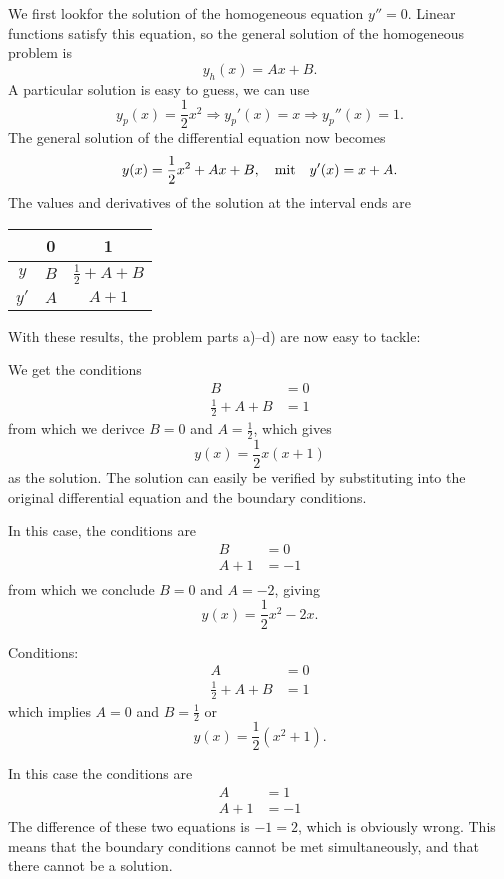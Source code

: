 \begin{loesung}
We first lookfor the solution of the homogeneous equation
$y''=0$.
Linear functions satisfy this equation, so the general solution of
the homogeneous problem is
\[
y_h(x)=Ax+B.
\]
A particular solution is easy to guess, we can use
\[
y_p(x)=\frac12x^2\Rightarrow y_p'(x)=x\Rightarrow y_p''(x)=1.
\]
The general solution of the differential equation now becomes
\[
y(x)=\frac12x^2+Ax+B, \text{\quad mit\quad} y'(x)=x+A.
\]
The values and derivatives of the solution at the interval ends are
\begin{center} 
\begin{tabular}{|c|cc|}
\hline
&0&1\\
\hline
$y$&$B$&$\frac12 +A+B$\\
$y'$&$A$&$A+1$\\
\hline
\end{tabular}
\end{center}
With these results, the problem parts a)--d) are now easy to tackle:
\begin{teilaufgaben}
\item
We get the conditions
\begin{align*}
B&=0\\
\frac12+A+B&=1
\end{align*}
from which we derivce $B=0$ and $A=\frac12$, which gives
\[
y(x)=\frac12x(x+1)
\]
as the solution.
The solution can easily be verified by substituting into the
original differential equation and the boundary conditions.
\item
In this case, the conditions are
\begin{align*}
B&=0\\
A+1&=-1\\
\end{align*}
from which we conclude $B=0$ and $A=-2$, giving
\[
y(x)=\frac12x^2-2x.
\]
\item
Conditions:
\begin{align*}
A&=0\\
\frac12+A+B&=1
\end{align*}
which implies $A=0$ and $B=\frac12$ or
\[
y(x)=\frac12(x^2+1).
\]
\item In this case the conditions are
\begin{align*}
A&=1\\
A+1&=-1
\end{align*}
The difference of these two equations is $-1=2$, which is obviously wrong.
This means that the boundary conditions cannot be met simultaneously,
and that there cannot be a solution.
\qedhere
\end{teilaufgaben}
\end{loesung}
